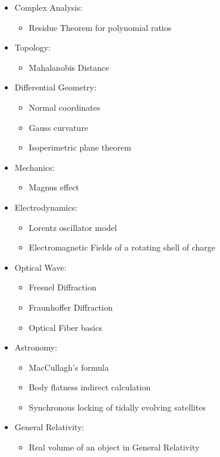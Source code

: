 \begin{itemize}
\begin{itemize}
			\end{itemize}
		\item Complex Analysis: 
			\begin{itemize}
				\item Residue Theorem for polynomial ratios
			\end{itemize}
		\item Topology: 
		\begin{itemize}
			\item Mahalanobis Distance
		\end{itemize}			
		\item Differential Geometry: 
			\begin{itemize}
				\item Normal coordinates
				\item Gauss curvature
				\item Isoperimetric plane theorem
			\end{itemize}	
		\item Mechanics: 
			\begin{itemize}
				\item Magnus effect
			\end{itemize}	
		\item Electrodynamics:
			\begin{itemize}		
				\item Lorentz oscillator model
				\item Electromagnetic Fields of a rotating shell of charge
			\end{itemize}
		\item Optical Wave:
			\begin{itemize}		
				\item Fresnel Diffraction
				\item Fraunhoffer Diffraction
				\item Optical Fiber basics
			\end{itemize} 
		\item Astronomy:
			\begin{itemize}	
				\item MacCullagh's formula
				\item Body flatness indirect calculation
				\item Synchronous locking of tidally evolving satellites		
			\end{itemize}		
		\item General Relativity:
			\begin{itemize}
				\item Real volume of an object in General Relativity

\end{itemize}
\end{itemize}
